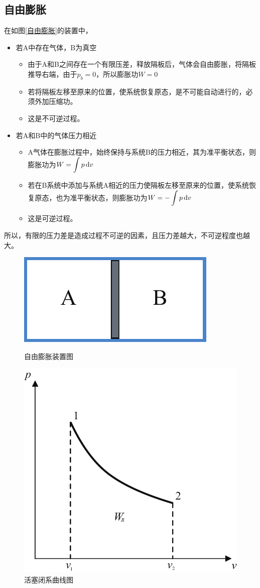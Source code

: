 \subsection{自由膨胀}
\noindent 在如图\ref{自由膨胀}的装置中，
\begin{itemize}
	\item 若A中存在气体，B为真空
	\begin{itemize}
		\item 由于A和B之间存在一个有限压差，释放隔板后，气体会自由膨胀，将隔板推导右端，由于$p_b = 0$，所以膨胀功$W = 0$
		\item 若将隔板左移至原来的位置，使系统恢复原态，是不可能自动进行的，必须外加压缩功。
		\item 这是不可逆过程。
	\end{itemize}
	\item 若A和B中的气体压力相近
	\begin{itemize}
		\item A气体在膨胀过程中，始终保持与系统B的压力相近，其为准平衡状态，则膨胀功为$\displaystyle W = \int p \, {\rm{d}} v$
		\item 若在B系统中添加与系统A相近的压力使隔板左移至原来的位置，使系统恢复原态，也为准平衡状态，则膨胀功为$\displaystyle W = -\int p \, {\rm{d}} v$
		\item 这是可逆过程。
	\end{itemize}
\end{itemize}
所以，有限的压力差是造成过程不可逆的因素，且压力差越大，不可逆程度也越大。
\vspace*{0.5em}
\begin{figure}[!htb]
	\begin{minipage}{0.5\linewidth}
		\centering
		\includegraphics[width=0.5\linewidth]{pic/自由膨胀.pdf}
		\caption{自由膨胀装置图}
		\label{自由膨胀}
	\end{minipage}
	\begin{minipage}{0.5\linewidth}
		\centering
		\includegraphics[width=0.62\linewidth]{pic/摩擦.pdf}
		\caption{活塞闭系曲线图}
		\label{活塞闭系曲线}
	\end{minipage}
\end{figure}
